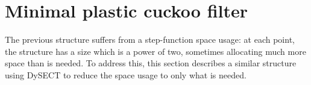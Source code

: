 \documentclass[letterpaper, 11pt]{article}
\newcommand{\ints}{\mathbb{Z}}
\begin{document}









\section{Minimal plastic cuckoo filter}
\label{mpcf}

The previous structure suffers from a step-function space usage:
at each point, the structure has a size which is a power of two, sometimes allocating much more space than is needed.
To address this, this section describes a similar structure using DySECT to reduce the space usage to only what is needed.~\cite{dysect}
\end{document}
